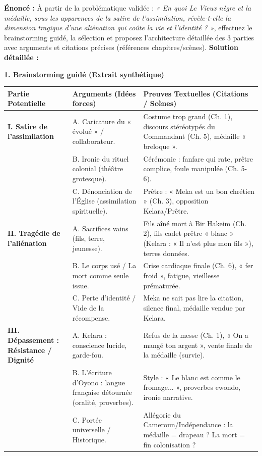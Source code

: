 \documentclass[11pt]{article}
\begin{document}
\begin{exoresolu}
\textbf{Énoncé :} À partir de la problématique validée : \emph{« En quoi Le Vieux nègre et la médaille, sous les apparences de la satire de l'assimilation, révèle-t-elle la dimension tragique d'une aliénation qui coûte la vie et l'identité ? »}, effectuez le brainstorming guidé, la sélection et proposez l'architecture détaillée des 3 parties avec arguments et citations précises (références chapitres/scènes).
\tcblower
\textbf{Solution détaillée :}

\textbf{1. Brainstorming guidé (Extrait synthétique)}

\begin{center}
\begin{tabularx}{\linewidth}{|l|X|X|}\hline
\textbf{Partie Potentielle} & \textbf{Arguments (Idées forces)} & \textbf{Preuves Textuelles (Citations / Scènes)} \\ \hline
\textbf{I. Satire de l'assimilation} & A. Caricature du « évolué » / collaborateur. & Costume trop grand (Ch. 1), discours stéréotypés du Commandant (Ch. 5), médaille « breloque ». \\
& B. Ironie du rituel colonial (théâtre grotesque). & Cérémonie : fanfare qui rate, prêtre complice, foule manipulée (Ch. 5-6). \\
& C. Dénonciation de l'Église (assimilation spirituelle). & Prêtre : « Meka est un bon chrétien » (Ch. 3), opposition Kelara/Prêtre. \\ \hline
\textbf{II. Tragédie de l'aliénation} & A. Sacrifices vains (fils, terre, jeunesse). & Fils aîné mort à Bir Hakeim (Ch. 2), fils cadet prêtre « blanc » (Kelara : « Il n'est plus mon fils »), terres données. \\
& B. Le corps usé / La mort comme seule issue. & Crise cardiaque finale (Ch. 6), « fer froid », fatigue, vieillesse prématurée. \\
& C. Perte d'identité / Vide de la récompense. & Meka ne sait pas lire la citation, silence final, médaille vendue par Kelara. \\ \hline
\textbf{III. Dépassement : Résistance / Dignité} & A. Kelara : conscience lucide, garde-fou. & Refus de la messe (Ch. 1), « On a mangé ton argent », vente finale de la médaille (survie). \\
& B. L'écriture d'Oyono : langue française détournée (oralité, proverbes). & Style : « Le blanc est comme le fromage... », proverbes ewondo, ironie narrative. \\
& C. Portée universelle / Historique. & Allégorie du Cameroun/Indépendance : la médaille = drapeau ? La mort = fin colonisation ? \\ \hline
\end{tabularx}
\end{center}


\end{exoresolu}
\end{document}
